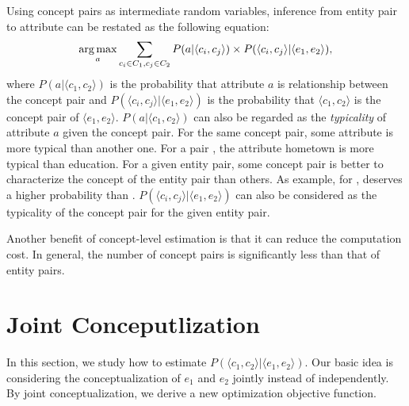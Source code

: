 Using concept pairs as intermediate random variables, inference from entity pair to attribute can be restated as the following equation:
\begin{equation}
\label{eq:target}
\operatorname*{arg\,max}_a \sum_{c_i\in C_1 , c_j \in C_2 }P(a|\langle c_{i},c_{j}\rangle)\times P(\langle c_{i},c_{j}\rangle|\langle e_{1},e_{2}\rangle),
\end{equation}
where $P(a|\langle c_{1},c_{2}\rangle)$ is the probability that attribute $a$ is relationship between the concept pair
and $P(\langle c_{i},c_{j}\rangle |\langle e_{1},e_{2}\rangle)$ is the probability that $\langle c_1, c_2\rangle$ is the concept pair of $ \langle e_1, e_2 \rangle $.
$P(a| \langle c_{1},c_{2} \rangle )$ can also be regarded as the {\it typicality} of attribute $a$ given the concept pair.
For the same concept pair, some attribute is more typical than another one.
For a pair , the attribute \ac{hometown} is more typical than \ac{education}.
For a given entity pair, some concept pair is better to characterize the concept of the entity pair than others.
As example,  for ,   deserves a higher probability than .
$P( \langle c_{i},c_{j} \rangle | \langle e_{1},e_{2} \rangle )$ can also be considered as the typicality of the concept pair for the given entity pair.


Another benefit of concept-level estimation is that it can reduce the computation cost.
In general, the number of concept pairs is significantly less than that of entity pairs.

\section{Joint Conceputlization}
In this section, we study how to estimate $P(\langle c_1,c_2\rangle | \langle e_1,e_2\rangle)$.
Our basic idea is considering the conceptualization of $e_1$ and $e_2$ jointly instead of independently.
By joint conceptualization, we derive a new optimization objective function.


